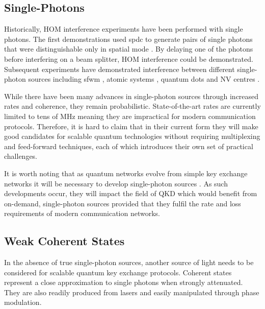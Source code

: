 
\subsection{Single-Photons}

Historically, \acl{HOM} interference experiments have been performed with single photons. The first demonstrations used \ac{spdc} to generate pairs of single photons that were distinguishable only in spatial mode \cite{HOM, Rarity1989}. By delaying one of the photons before interfering on a beam splitter, \ac{HOM} interference could be demonstrated. Subsequent experiments have demonstrated interference between different single-photon sources including \ac{sfwm} \cite{jiang2015}, atomic systems \cite{Leong2015}, quantum dots \cite{somaschi2016} and NV centres \cite{Bernien2012}.


While there have been many advances in single-photon sources through increased rates and coherence, they remain probabilistic. State-of-the-art rates are currently limited to tens of MHz \cite{chen2018} meaning they are impractical for modern communication protocols. Therefore, it is hard to claim that in their current form they will make good candidates for scalable quantum technologies without requiring multiplexing and feed-forward techniques, each of which introduces their own set of practical challenges. 

It is worth noting that as quantum networks evolve from simple key exchange networks it will be necessary to develop single-photon sources \cite{wehner2018}. As such developments occur, they will impact the field of \ac{QKD} which would benefit from on-demand, single-photon sources provided that they fulfil the rate and loss requirements of modern communication networks. 


\subsection{Weak Coherent States}

In the absence of true single-photon sources, another source of light needs to be considered for scalable quantum key exchange protocols. Coherent states represent a close approximation to single photons when strongly attenuated. They are also readily produced from lasers and easily manipulated through phase modulation. 

